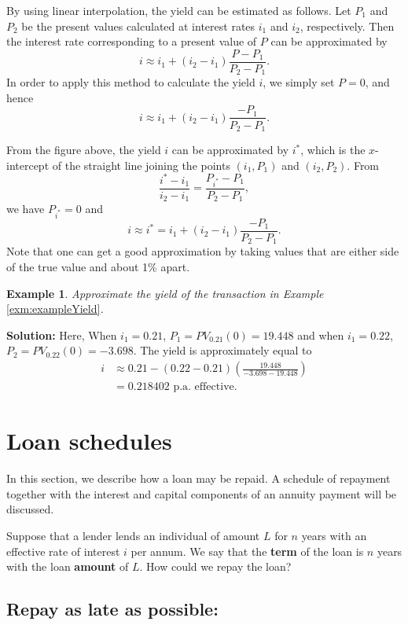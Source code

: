 \documentclass[landscape, 20pt]{extreport}
\theoremstyle{definition}
\theoremstyle{definition}
\newtheorem{example}{Example}[chapter]
\theoremstyle{definition}
\theoremstyle{definition}
\theoremstyle{remark}
\begin{document}
By using linear interpolation, the yield can be estimated as follows.
Let \(P_1\) and \(P_2\) be the present values calculated at interest rates
\(i_1\) and \(i_2\), respectively. Then the interest rate corresponding to a
present value of \(P\) can be approximated by
\[i \approx i_1 + (i_2 - i_1) \frac{P - P_1}{P_2 - P_1}.\] In order to
apply this method to calculate the yield \(i\), we simply set \(P = 0\), and
hence \[i \approx i_1 + (i_2 - i_1) \frac{ - P_1}{P_2 - P_1}.\]

From the figure above, the yield \(i\) can be approximated by \(i^*\), which
is the \(x\)-intercept of the straight line joining the points \((i_1,P_1)\)
and \((i_2,P_2)\). From
\[\frac{i^* -i_1}{i_2 - i_1} = \frac{P_{i^*} - P_1}{P_2 - P_1},\] we
have \(P_{i^*} = 0\) and
\[i \approx i^* =  i_1 + (i_2 - i_1) \frac{ - P_1}{P_2 - P_1}.\] Note
that one can get a good approximation by taking values that are either
side of the true value and about 1\% apart.

\newpage \begin{example}
\emph{Approximate the yield of the transaction in Example}
\ref{exm:exampleYield}\emph{.}
\end{example}

\textbf{Solution:} Here, When \(i_1 = 0.21\), \(P_1 = PV_{0.21}(0) = 19.448\) and
when \(i_1 = 0.22\), \(P_2 = PV_{0.22}(0) = -3.698.\) The yield is
approximately equal to \[\begin{aligned}
 i &\approx 0.21 - (0.22 - 0.21) \left(  \frac{19.448}{-3.698 - 19.448} \right) \\
   &= 0.218402 \text{ p.a. effective.}\end{aligned}\]

\newpage \hypertarget{loan-schedules}{%
\section{Loan schedules}\label{loan-schedules}}

In this section, we describe how a loan may be repaid. A schedule of
repayment together with the interest and capital components of an
annuity payment will be discussed.

Suppose that a lender lends an individual of amount \(L\) for \(n\) years
with an effective rate of interest \(i\) per annum. We say that the
\textbf{term} of the loan is \(n\) years with the loan \textbf{amount} of \(L\). How
could we repay the loan?

\newpage \hypertarget{repay-as-late-as-possible}{%
\subsection*{Repay as late as possible:}\label{repay-as-late-as-possible}}
\end{document}
